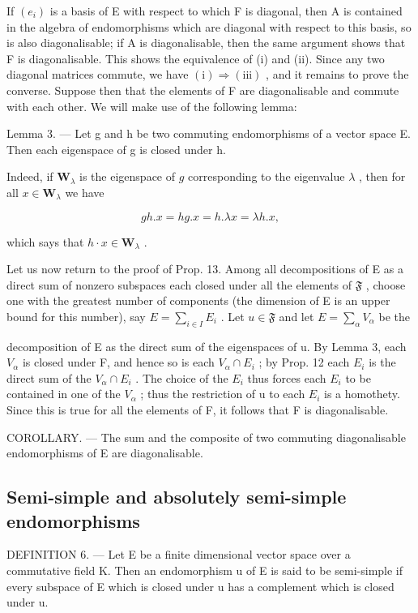 If \((e_{i})\) is a basis of E with respect to which F is diagonal, then A is contained in the algebra of endomorphisms which are diagonal with respect to this basis, so is also diagonalisable; if A is diagonalisable, then the same argument shows that F is diagonalisable. This shows the equivalence of (i) and (ii). Since any two diagonal matrices commute, we have \((\mathrm{i}) \Rightarrow (\mathrm{iii})\) , and it remains to prove the converse. Suppose then that the elements of F are diagonalisable and commute with each other. We will make use of the following lemma:

Lemma 3. --- Let g and h be two commuting endomorphisms of a vector space E. Then each eigenspace of g is closed under h.

Indeed, if \(\mathbf{W}_{\lambda}\) is the eigenspace of \(g\) corresponding to the eigenvalue \(\lambda\) , then for all \(x \in \mathbf{W}_{\lambda}\) we have

\[
g h. x = h g. x = h. \lambda x = \lambda h. x,
\]

which says that \(h \cdot x \in \mathbf{W}_{\lambda}\) .

Let us now return to the proof of Prop. 13. Among all decompositions of E as a direct sum of nonzero subspaces each closed under all the elements of \(\mathfrak{F}\) , choose one with the greatest number of components (the dimension of E is an upper bound for this number), say \(E = \sum_{i\in I}E_i\) . Let \(u\in \mathfrak{F}\) and let \(E = \sum_{\alpha}V_{\alpha}\) be the

decomposition of E as the direct sum of the eigenspaces of u. By Lemma 3, each \(V_{\alpha}\) is closed under F, and hence so is each \(V_{\alpha} \cap E_{i}\) ; by Prop. 12 each \(E_{i}\) is the direct sum of the \(V_{\alpha} \cap E_{i}\) . The choice of the \(E_{i}\) thus forces each \(E_{i}\) to be contained in one of the \(V_{\alpha}\) ; thus the restriction of u to each \(E_{i}\) is a homothety. Since this is true for all the elements of F, it follows that F is diagonalisable.

COROLLARY. --- The sum and the composite of two commuting diagonalisable endomorphisms of E are diagonalisable.

\subsection{Semi-simple and absolutely semi-simple endomorphisms}

DEFINITION 6. --- Let E be a finite dimensional vector space over a commutative field K. Then an endomorphism u of E is said to be semi-simple if every subspace of E which is closed under u has a complement which is closed under u.

